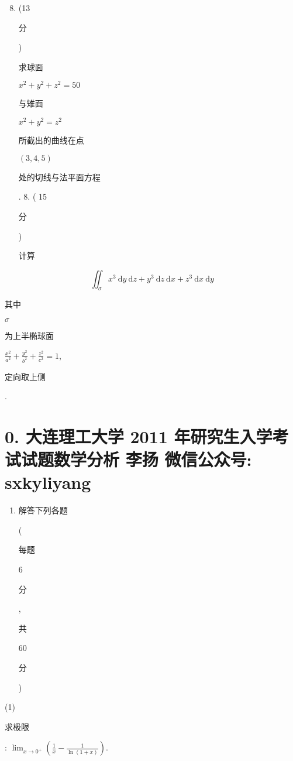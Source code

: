 \documentclass[10pt]{article}
\begin{document}
\begin{enumerate}
  \setcounter{enumi}{7}
  \item (13 \begin{CJK}{UTF8}{mj}分\end{CJK}) \begin{CJK}{UTF8}{mj}求球面\end{CJK} $x^{2}+y^{2}+z^{2}=50$ \begin{CJK}{UTF8}{mj}与雉面\end{CJK} $x^{2}+y^{2}=z^{2}$ \begin{CJK}{UTF8}{mj}所截出的曲线在点\end{CJK} $(3,4,5)$ \begin{CJK}{UTF8}{mj}处的切线与法平面方程\end{CJK}. 8. ( 15 \begin{CJK}{UTF8}{mj}分\end{CJK}) \begin{CJK}{UTF8}{mj}计算\end{CJK}
\end{enumerate}
$$
\iint_{\sigma} x^{3} \mathrm{~d} y \mathrm{~d} z+y^{3} \mathrm{~d} z \mathrm{~d} x+z^{3} \mathrm{~d} x \mathrm{~d} y
$$
\begin{CJK}{UTF8}{mj}其中\end{CJK} $\sigma$ \begin{CJK}{UTF8}{mj}为上半椭球面\end{CJK} $\frac{x^{2}}{a^{2}}+\frac{y^{2}}{b^{2}}+\frac{z^{2}}{c^{2}}=1$, \begin{CJK}{UTF8}{mj}定向取上侧\end{CJK}.

\section{0. 大连理工大学 2011 年研究生入学考试试题数学分析 
 李扬 
 微信公众号: sxkyliyang}
\begin{enumerate}
  \item \begin{CJK}{UTF8}{mj}解答下列各题\end{CJK} (\begin{CJK}{UTF8}{mj}每题\end{CJK} 6 \begin{CJK}{UTF8}{mj}分\end{CJK}, \begin{CJK}{UTF8}{mj}共\end{CJK} 60 \begin{CJK}{UTF8}{mj}分\end{CJK})
\end{enumerate}
(1) \begin{CJK}{UTF8}{mj}求极限\end{CJK}: $\lim _{x \rightarrow 0^{+}}\left(\frac{1}{x}-\frac{1}{\ln (1+x)}\right)$.
\end{document}
